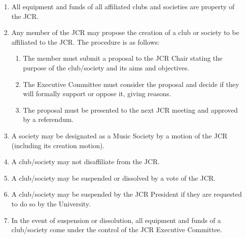 \documentclass[12pt]{article}
\begin{document}
\begin{enumerate}
    \item All equipment and funds of all affiliated clubs and societies are property of the JCR.
    \item Any member of the JCR may propose the creation of a club or society to be affiliated to the JCR. The procedure is as follows:
    \begin{enumerate}
        \item The member must submit a proposal to the JCR Chair stating the purpose of the club/society and its aims and objectives.
        \item The Executive Committee must consider the proposal and decide if they will formally support or oppose it, giving reasons.
        \item The proposal must be presented to the next JCR meeting and approved by a referendum.
    \end{enumerate}
    \item A society may be designated as a Music Society by a motion of the JCR (including its creation motion).
    \item A club/society may not disaffiliate from the JCR.
    \item A club/society may be suspended or dissolved by a vote of the JCR.
    \item A club/society may be suspended by the JCR President if they are requested to do so by the University.
    \item In the event of suspension or dissolution, all equipment and funds of a club/society come under the control of the JCR Executive Committee.
\end{enumerate}
\newpage
\end{document}
